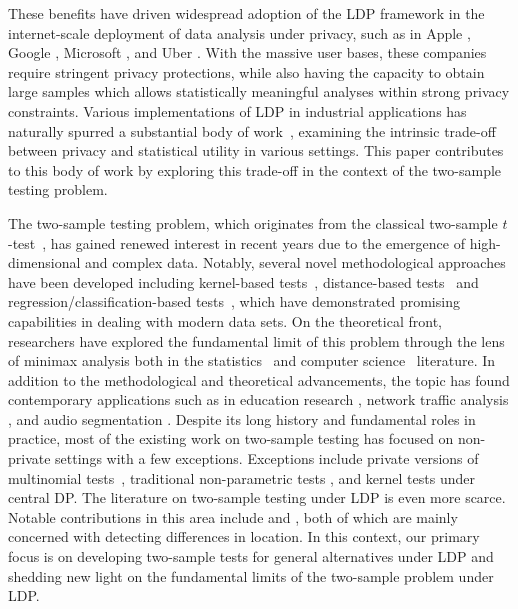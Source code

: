\documentclass[twoside,11pt]{article}
\begin{document}
These benefits have driven widespread adoption of the LDP framework in the internet-scale deployment of data analysis under privacy, such as in
Apple \citep{Apple2017Privacy},
Google \citep{erlingsson_rappor_2014},
Microsoft \citep{Ding2017CollectingPrivately},
and Uber \citep{Near2017Uber}. With the massive user bases, these companies require stringent privacy protections, while also having the capacity to obtain large samples which allows statistically meaningful analyses within strong privacy constraints. Various implementations of LDP in industrial applications has naturally spurred a substantial body of work~\citep{Acharya2021DifferentiallyCam, Duchi2018MinimaxEstimation, Lam-Weil2021MinimaxConstraint, Lalanne2023on, Tony2021DP}, examining the intrinsic trade-off between privacy and statistical utility in various settings. This paper contributes to this body of work by exploring this trade-off in the context of the two-sample testing problem. 

The two-sample testing problem, which originates from the classical two-sample $t$-test~\citep{Student1908Twosample}, has gained renewed interest in recent years due to the emergence of high-dimensional and complex data.  
Notably, several novel methodological approaches have been developed including kernel-based tests~\citep{Gretton2009FastKernel, Gretton2012ATest}, distance-based tests~\citep{Szekely2004Energy} and regression/classification-based tests~\citep{kim2019,kim2021}, which have demonstrated promising capabilities in dealing with modern data sets.
On the theoretical front, researchers have explored the fundamental limit of this problem through the lens of minimax analysis both in the statistics~\citep[e.g.,][]{Arias-Castro2018RememberDimension, kim_minimax_2022, Schrab2021MMDTest} and computer science~\citep[e.g.,][]{Batu2000NonprivateTwosample, Chan2014Nonprivate, Diakonikolas2016Nonprivate, Goldreich2000Nonprivate} literature.
In addition to the methodological and theoretical advancements, the topic has found contemporary applications such as in education research \citep{Rabin2019ModelingTests}, network traffic analysis \citep{Kohout2018NetworkTest}, and audio segmentation \citep{Harchaoui2009ASegmentation}.
Despite its long history and fundamental roles in practice, most of the existing work on two-sample testing has focused on non-private settings with a few exceptions. Exceptions include private versions of
multinomial tests~\citep{Acharya2018dPGofTwosample, Aliakbarpour2019PrivatePermutations,Aliakbarpour2018DPgof},
traditional non-parametric tests \citep[e.g.,~Mann-Whitney and Wilcoxon signed-rank tests;][]{Couch2019NonparamTwosample,Task2016Wilcoxon},
and kernel tests \citep{Raj2020ATest,kim2023dp} under central DP. The literature on two-sample testing under LDP is even more scarce. Notable contributions in this area include \cite{Ding2018TwosampleMean} and \cite{Waudby-Smith2022LDPTwosample}, both of which are mainly concerned with detecting differences in location. In this context, our primary focus is on developing two-sample tests for general alternatives under LDP and shedding new light on the fundamental limits of the two-sample problem under LDP. 
\end{document}
